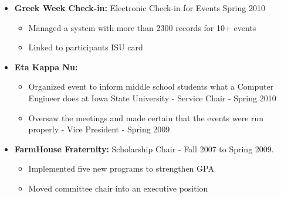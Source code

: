 \documentclass[oneside]{article}
\begin{document}
\begin{itemize}
\item{\bf Greek Week Check-in:} Electronic Check-in for Events Spring 2010
\begin{itemize}
  \item Managed a system with more than 2300 records for 10+ events
  \item Linked to participants ISU card
\end{itemize}

\item{\bf Eta Kappa Nu:}
\begin{itemize}
  \item Organized event to inform middle school students what a Computer Engineer does at Iowa State University - Service Chair - Spring 2010
  \item Oversaw the meetings and made certain that the events were run properly - Vice President - Spring 2009
\end{itemize}

\item{\bf FarmHouse Fraternity:} Scholarship Chair - Fall 2007 to Spring 2009.
\begin{itemize}
  \item Implemented five new programs to strengthen GPA
  \item Moved committee chair into an executive position
\end{itemize}


\end{itemize}
\end{document}
